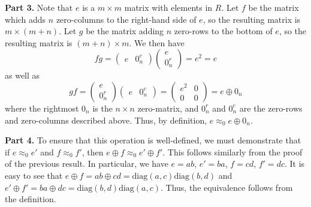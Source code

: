 \documentclass[aps,pra,showpacs,notitlepage,onecolumn,superscriptaddress,nofootinbib]{revtex4-1}
\theoremstyle{definition}
\begin{document}
\noindent \textbf{Part 3.} Note that $e$ is a $m \times m$ matrix with elements in $R$. Let $f$ be the matrix which adds $n$ zero-columns to the right-hand side of $e$, so the resulting matrix is $m \times (m + n)$. Let $g$ be the
matrix adding $n$ zero-rows to the bottom of $e$, so the resulting matrix is $(m + n) \times m$. We then have
\begin{equation}
  f g = \begin{pmatrix} e & 0^c_{n} \end{pmatrix} \begin{pmatrix} e \\ 0^r_{n} \end{pmatrix} = e^2 = e
\end{equation}
as well as
\begin{equation}
  g f = \begin{pmatrix} e \\ 0^r_{n} \end{pmatrix}  \begin{pmatrix} e & 0^c_{n} \end{pmatrix} =  \begin{pmatrix} e^2 & 0 \\ 0 & 0 \end{pmatrix} = e \oplus 0_n
\end{equation}
where the rightmost $0_n$ is the $n \times n$ zero-matrix, and $0_n^r$ and $0_n^c$ are the zero-rows and zero-columns described above. Thus, by definition, $e \approx_0 e \oplus 0_n$.
\newline

\noindent \textbf{Part 4.} To ensure that this operation is well-defined, we must demonstrate that if $e \approx_0 e'$ and $f \approx_0 f'$, then $e \oplus f \approx_0 e' \oplus f'$. This follows similarly from the
proof of the previous result. In particular, we have $e = ab$, $e' = ba$, $f = cd$, $f' = dc$. It is easy to see that $e \oplus f = ab \oplus cd = \text{diag}(a, c) \text{diag}(b, d)$ and $e' \oplus f' = ba \oplus dc = \text{diag}(b, d)\text{diag}(a, c)$. Thus,
the equivalence follows from the definition.
\newline
\end{document}
